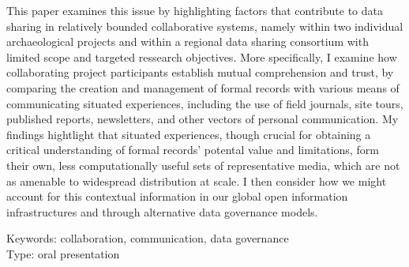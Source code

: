 \documentclass[a4paper]{article}
\begin{document}
This paper examines this issue by highlighting factors that contribute to data sharing in relatively bounded collaborative systems, namely within two individual archaeological projects and within a regional data sharing consortium with limited scope and targeted ressearch objectives. More specifically, I examine how collaborating project participants establish mutual comprehension and trust, by comparing the creation and management of formal records with various means of communicating situated experiences, including the use of field journals, site tours, published reports, newsletters, and other vectors of personal communication. My findings hightlight that situated experiences, though crucial for obtaining a critical understanding of formal records' potental value and limitations, form their own, less computationally useful sets of representative media, which are not as amenable to widespread distribution at scale. I then consider how we might account for this contextual information in our global open information infrastructures and through alternative data governance models.

\hspace{10pt}

\normalsize
\noindent
Keywords: collaboration, communication, data governance\\
Type: oral presentation

\printbibliography
\end{document}
